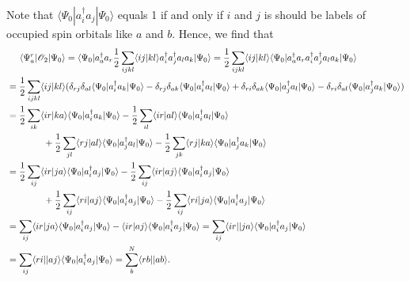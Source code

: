 \documentclass[a4paper]{book}
\newcounter{solution}[chapter]
\begin{document}
\begin{solution}
	Note that $\langle \Psi_0 | a^\dagger_i a_j | \Psi_0 \rangle$ equals 1 if and only if $i$ and $j$ is should be labels of occupied spin orbitals like $a$ and $b$. Hence, we find that
	\begin{align*}
		&\hspace{1.4em}\langle \Psi^r_a | \mathscr{O}_2 | \Psi_0 \rangle = \langle \Psi_0 | a^\dagger_a a_r \frac{1}{2}\sum_{ijkl} \langle ij | kl \rangle a^\dagger_i a^\dagger_j a_l a_k | \Psi_0 \rangle = \frac{1}{2} \sum_{ijkl} \langle ij | kl \rangle \langle \Psi_0 | a^\dagger_a a_r a^\dagger_i a^\dagger_j a_l a_k  | \Psi_0 \rangle \\
		&= \frac{1}{2} \sum_{ijkl} \langle ij | kl \rangle ( \delta_{rj} \delta_{al} \langle \Psi_0 | a^\dagger_i a_k | \Psi_0 \rangle - \delta_{rj} \delta_{ak} \langle \Psi_0 | a^\dagger_i a_l | \Psi_0 \rangle + \delta_{ri} \delta_{ak} \langle \Psi_0 | a^\dagger_j a_l | \Psi_0 \rangle - \delta_{ri} \delta_{al} \langle \Psi_0 | a^\dagger_j a_k | \Psi_0 \rangle ) \\
		&= \frac{1}{2} \sum_{ik} \langle ir | ka \rangle \langle \Psi_0 | a^\dagger_i a_k | \Psi_0 \rangle - \frac{1}{2} \sum_{il} \langle ir | al \rangle \langle \Psi_0 | a^\dagger_i a_l | \Psi_0 \rangle \\
		&\hspace{4em} + \frac{1}{2} \sum_{jl} \langle rj | al \rangle \langle \Psi_0 | a^\dagger_j a_l | \Psi_0 \rangle - \frac{1}{2} \sum_{jk} \langle rj | ka \rangle \langle \Psi_0 | a^\dagger_j a_k | \Psi_0 \rangle \\
		&= \frac{1}{2} \sum_{ij} \langle ir | ja \rangle \langle \Psi_0 | a^\dagger_i a_j | \Psi_0 \rangle - \frac{1}{2} \sum_{ij} \langle ir | aj \rangle \langle \Psi_0 | a^\dagger_i a_j | \Psi_0 \rangle \\
		&\hspace{4em} + \frac{1}{2} \sum_{ij} \langle ri | aj \rangle \langle \Psi_0 | a^\dagger_i a_j | \Psi_0 \rangle - \frac{1}{2} \sum_{ij} \langle ri | ja \rangle \langle \Psi_0 | a^\dagger_i a_j | \Psi_0 \rangle \\
		&= \sum_{ij} \langle ir | ja \rangle \langle \Psi_0 | a^\dagger_i a_j | \Psi_0 \rangle - \langle ir | aj \rangle \langle \Psi_0 | a^\dagger_i a_j | \Psi_0 \rangle = \sum_{ij} \langle ir || ja \rangle \langle \Psi_0 | a^\dagger_i a_j | \Psi_0 \rangle \\
		&= \sum_{ij} \langle ri || aj \rangle \langle \Psi_0 | a^\dagger_i a_j | \Psi_0 \rangle = \sum_b^N \langle rb || ab \rangle .
	\end{align*}
	
	\end{solution}
	
\end{document}
